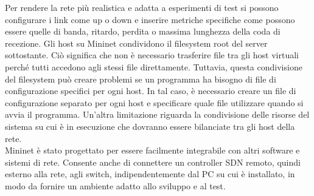 Per rendere la rete più realistica e adatta a esperimenti di test si possono configurare i link come up o down e inserire metriche specifiche 
come possono essere quelle di banda, ritardo, perdita o massima lunghezza della coda di recezione.
Gli host su Mininet condividono il filesystem root del server sottostante. 
Ciò significa che non è necessario trasferire file tra gli host virtuali perché tutti accedono agli stessi file direttamente.
Tuttavia, questa condivisione del filesystem può creare problemi se un programma ha bisogno di file di configurazione specifici per ogni host. 
In tal caso, è necessario creare un file di configurazione separato per ogni host e specificare quale file utilizzare quando si avvia il programma.
Un'altra limitazione riguarda la condivisione delle risorse del sistema su cui è in esecuzione che dovranno essere bilanciate tra gli host della rete.
\\Mininet è stato progettato per essere facilmente integrabile con altri software e sistemi di rete.
Consente anche di connettere un controller SDN remoto, quindi esterno alla rete, agli switch, indipendentemente dal PC su cui è installato, in modo da fornire un ambiente adatto allo sviluppo e al test.


